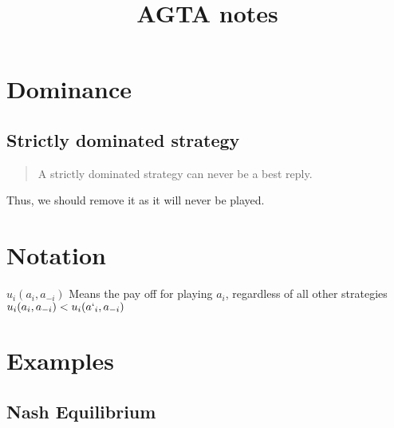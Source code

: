 \documentclass[11pt]{article}
\begin{document}
\title{AGTA notes}
\maketitle

\section{Dominance}

\subsection{Strictly dominated strategy}
\begin{quote}
A strictly dominated strategy can never be a best reply.
\end{quote}
Thus, we should remove it as it will never be played. 

\section{Notation}
$u_{i}(a_{i}, a_{-i})$ Means the pay off for playing $a_{i}$, regardless of all other strategies \\
$u_{i}(a_{i}, a_{-i}) < u_{i}(a`_{i}, a_{-i})$

\section{Examples}
\subsection{Nash Equilibrium}
\end{document}
